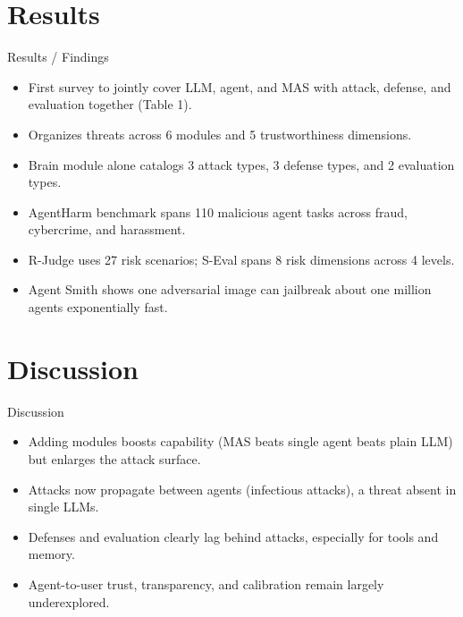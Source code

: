 \documentclass[10pt]{beamer}
\begin{document}
\section{Results}
\begin{frame}[allowframebreaks]{Results / Findings}
\begin{itemize}
  \item First survey to jointly cover LLM, agent, and MAS with attack, defense, and evaluation together (Table 1).
  \item Organizes threats across 6 modules and 5 trustworthiness dimensions.
  \item Brain module alone catalogs 3 attack types, 3 defense types, and 2 evaluation types.
  \item AgentHarm benchmark spans 110 malicious agent tasks across fraud, cybercrime, and harassment.
  \item R-Judge uses 27 risk scenarios; S-Eval spans 8 risk dimensions across 4 levels.
  \item Agent Smith shows one adversarial image can jailbreak about one million agents exponentially fast.
\end{itemize}
\end{frame}
\section{Discussion}
\begin{frame}{Discussion}
\begin{itemize}
  \item Adding modules boosts capability (MAS beats single agent beats plain LLM) but enlarges the attack surface.
  \item Attacks now propagate between agents (infectious attacks), a threat absent in single LLMs.
  \item Defenses and evaluation clearly lag behind attacks, especially for tools and memory.
  \item Agent-to-user trust, transparency, and calibration remain largely underexplored.
\end{itemize}
\end{frame}
\end{document}
